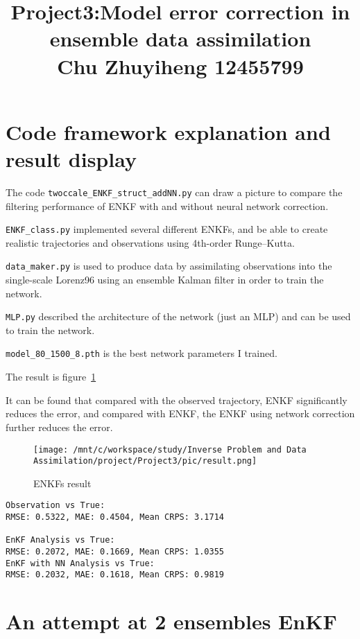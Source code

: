 \documentclass[11pt,reqno]{amsart}
\begin{document}
\title[]{Project3:Model error correction in ensemble data assimilation\\Chu Zhuyiheng 12455799}
\maketitle


\section{Code framework explanation and result display}

The code \verb|twoccale_ENKF_struct_addNN.py| can draw a picture to compare
the filtering performance of ENKF with and without neural network correction.

\verb|ENKF_class.py| implemented several different ENKFs, and be able to create realistic trajectories and observations using 4th-order Runge–Kutta.

\verb|data_maker.py| is used to produce data by assimilating observations into the single-scale Lorenz96 using an ensemble Kalman filter in order to train the network.

\verb|MLP.py| described the architecture of the network (just an MLP) and can be used to train the network.

\verb|model_80_1500_8.pth| is the best network parameters I trained.

The result is figure~\ref{fig:ENKFs_result}

It can be found that compared with the observed trajectory, ENKF significantly reduces the error, and compared with ENKF, the ENKF using network correction further reduces the error.

\begin{figure}[htbp]
  \centering
      \texttt{[image: /mnt/c/workspace/study/Inverse Problem and Data Assimilation/project/Project3/pic/result.png]} %
      \caption{ENKFs result}
      \label{fig:ENKFs_result}
\end{figure}
\begin{verbatim}
Observation vs True:
RMSE: 0.5322, MAE: 0.4504, Mean CRPS: 3.1714

EnKF Analysis vs True:
RMSE: 0.2072, MAE: 0.1669, Mean CRPS: 1.0355
EnKF with NN Analysis vs True:
RMSE: 0.2032, MAE: 0.1618, Mean CRPS: 0.9819
\end{verbatim}

\section{An attempt at 2 ensembles EnKF}
\end{document}
